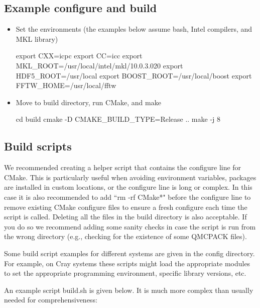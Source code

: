 \subsection{Example configure and build}
\begin{itemize}
\item Set the environments (the examples below assume bash, Intel compilers, and MKL library)

\begin{shade}
export CXX=icpc
export CC=icc
export MKL_ROOT=/usr/local/intel/mkl/10.0.3.020
export HDF5_ROOT=/usr/local
export BOOST_ROOT=/usr/local/boost
export FFTW_HOME=/usr/local/fftw
\end{shade}

\item Move to build directory, run CMake, and make

\begin{shade}
cd build
cmake -D CMAKE_BUILD_TYPE=Release ..
make -j 8
\end{shade}
\end{itemize}

\subsection{Build scripts}
We recommended creating a helper script that contains the
configure line for CMake.  This is particularly useful when avoiding
environment variables, packages are installed in custom locations,
or the configure line is long or complex.  In this case it is also
recommended to add ``rm -rf CMake*" before the configure line to remove
existing CMake configure files to ensure a fresh configure each time
the script is called. Deleting all the files in the build
directory is also acceptable. If you do so we recommend adding some sanity
checks in case the script is run from the wrong directory (e.g.,
checking for the existence of some QMCPACK files).

Some build script examples for different systems are given in the
config directory. For example, on Cray systems these scripts might
load the appropriate modules to set the appropriate programming
environment, specific library versions, etc.

An example script build.sh is given below. It is much more complex
than usually needed for comprehensiveness:



